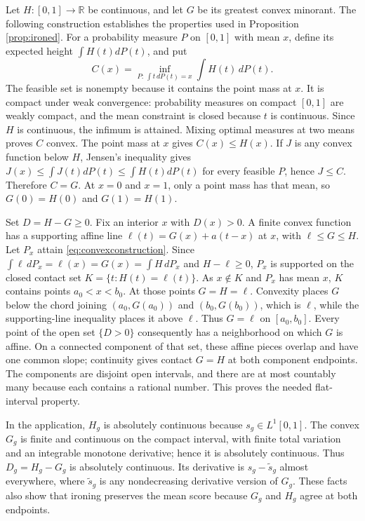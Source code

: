 \documentclass[11pt]{article}
\begin{document}
Let $H:[0,1]\to\mathbb R$ be continuous, and let $G$ be its greatest convex minorant. The following construction establishes the properties used in Proposition \ref{prop:ironed}. For a probability measure $P$ on $[0,1]$ with mean $x$, define its expected height $\int H(t)dP(t)$, and put
\begin{equation}\label{eq:convexconstruction}
C(x)=\inf_{P:\,\int t\,dP(t)=x}\int H(t)\,dP(t).
\end{equation}
The feasible set is nonempty because it contains the point mass at $x$. It is compact under weak convergence: probability measures on compact $[0,1]$ are weakly compact, and the mean constraint is closed because $t$ is continuous. Since $H$ is continuous, the infimum is attained. Mixing optimal measures at two means proves $C$ convex. The point mass at $x$ gives $C(x)\le H(x)$. If $J$ is any convex function below $H$, Jensen's inequality gives $J(x)\le\int J(t)dP(t)\le\int H(t)dP(t)$ for every feasible $P$, hence $J\le C$. Therefore $C=G$. At $x=0$ and $x=1$, only a point mass has that mean, so $G(0)=H(0)$ and $G(1)=H(1)$.

Set $D=H-G\ge0$. Fix an interior $x$ with $D(x)>0$. A finite convex function has a supporting affine line $\ell(t)=G(x)+a(t-x)$ at $x$, with $\ell\le G\le H$. Let $P_x$ attain \eqref{eq:convexconstruction}. Since $\int\ell\,dP_x=\ell(x)=G(x)=\int H\,dP_x$ and $H-\ell\ge0$, $P_x$ is supported on the closed contact set $K=\{t:H(t)=\ell(t)\}$. As $x\notin K$ and $P_x$ has mean $x$, $K$ contains points $a_0<x<b_0$. At those points $G=H=\ell$. Convexity places $G$ below the chord joining $(a_0,G(a_0))$ and $(b_0,G(b_0))$, which is $\ell$, while the supporting-line inequality places it above $\ell$. Thus $G=\ell$ on $[a_0,b_0]$. Every point of the open set $\{D>0\}$ consequently has a neighborhood on which $G$ is affine. On a connected component of that set, these affine pieces overlap and have one common slope; continuity gives contact $G=H$ at both component endpoints. The components are disjoint open intervals, and there are at most countably many because each contains a rational number. This proves the needed flat-interval property.

In the application, $H_g$ is absolutely continuous because $s_g\in L^1[0,1]$. The convex $G_g$ is finite and continuous on the compact interval, with finite total variation and an integrable monotone derivative; hence it is absolutely continuous. Thus $D_g=H_g-G_g$ is absolutely continuous. Its derivative is $s_g-\widetilde s_g$ almost everywhere, where $\widetilde s_g$ is any nondecreasing derivative version of $G_g$. These facts also show that ironing preserves the mean score because $G_g$ and $H_g$ agree at both endpoints.
\end{document}
